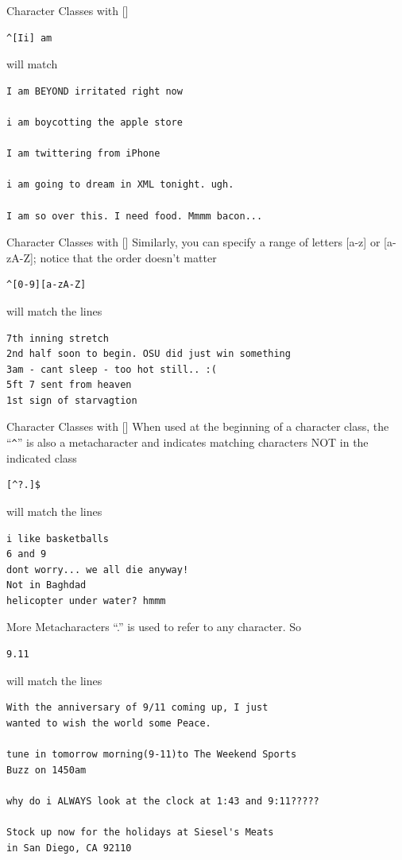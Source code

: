 \documentclass{beamer}
\begin{document}
\begin{frame}[fragile]{Character Classes with []}
\begin{verbatim}
^[Ii] am
\end{verbatim}
will match
\begin{verbatim}
I am BEYOND irritated right now

i am boycotting the apple store

I am twittering from iPhone

i am going to dream in XML tonight. ugh.

I am so over this. I need food. Mmmm bacon...
\end{verbatim}
\end{frame}

\begin{frame}[fragile]{Character Classes with []}
Similarly, you can specify a range of letters [a-z] or 
[a-zA-Z]; notice that the order doesn't matter
\begin{verbatim}
^[0-9][a-zA-Z]
\end{verbatim}
will match the lines 
\begin{verbatim}
7th inning stretch
2nd half soon to begin. OSU did just win something
3am - cant sleep - too hot still.. :(
5ft 7 sent from heaven 
1st sign of starvagtion
\end{verbatim}
\end{frame}

\begin{frame}[fragile]{Character Classes with []}
When used at the beginning of a character class, the ``\verb+^+'' is also a 
metacharacter and indicates matching characters NOT in the 
indicated class
\begin{verbatim}
[^?.]$
\end{verbatim}
will match the lines 
\begin{verbatim}
i like basketballs 
6 and 9
dont worry... we all die anyway! 
Not in Baghdad
helicopter under water? hmmm
\end{verbatim}
\end{frame}

\begin{frame}[fragile]{More Metacharacters}
``.'' is used to refer to any character. So
\begin{verbatim}
9.11
\end{verbatim}
will match the lines 
\begin{verbatim}
With the anniversary of 9/11 coming up, I just 
wanted to wish the world some Peace.

tune in tomorrow morning(9-11)to The Weekend Sports 
Buzz on 1450am

why do i ALWAYS look at the clock at 1:43 and 9:11?????

Stock up now for the holidays at Siesel's Meats 
in San Diego, CA 92110
\end{verbatim}
\end{frame}
\end{document}
